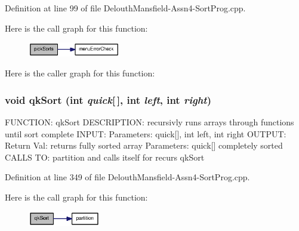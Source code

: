 Definition at line 99 of file DelouthMansfield-\/Assn4-\/SortProg.cpp.



Here is the call graph for this function:\nopagebreak
\begin{figure}[H]
\begin{center}
\leavevmode
\includegraphics[width=114pt]{_delouth_mansfield-_assn4-_sort_prog_8cpp_a401a41ad70746c8dd39ecc19286b5e38_cgraph}
\end{center}
\end{figure}




Here is the caller graph for this function:

\hypertarget{_delouth_mansfield-_assn4-_sort_prog_8cpp_a4b4f1e40ba9dfe94bf95212975063b17}{
\subsubsection[{qkSort}]{\setlength{\rightskip}{0pt plus 5cm}void qkSort (int {\em quick}\mbox{[}$\,$\mbox{]}, \/  int {\em left}, \/  int {\em right})}}
\label{_delouth_mansfield-_assn4-_sort_prog_8cpp_a4b4f1e40ba9dfe94bf95212975063b17}
FUNCTION: qkSort DESCRIPTION: recursivly runs arrays through functions until sort complete INPUT: Parameters: quick\mbox{[}\mbox{]}, int left, int right OUTPUT: Return Val: returns fully sorted array Parameters: quick\mbox{[}\mbox{]} completely sorted CALLS TO: partition and calls itself for recurs qkSort 

Definition at line 349 of file DelouthMansfield-\/Assn4-\/SortProg.cpp.



Here is the call graph for this function:\nopagebreak
\begin{figure}[H]
\begin{center}
\leavevmode
\includegraphics[width=89pt]{_delouth_mansfield-_assn4-_sort_prog_8cpp_a4b4f1e40ba9dfe94bf95212975063b17_cgraph}
\end{center}
\end{figure}





